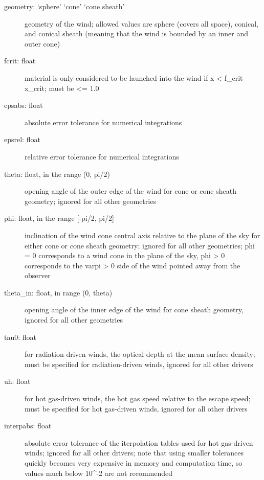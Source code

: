 \documentclass[letterpaper,10pt,english]{sphinxmanual}
\begin{document}
\begin{fulllineitems}
\begin{fulllineitems}
\begin{description}
\begin{description}
\item[{geometry: `sphere' \textbar{} `cone' \textbar{} `cone sheath'}] \leavevmode
geometry of the wind; allowed values are sphere (covers
all space), conical, and conical sheath (meaning that
the wind is bounded by an inner and outer cone)

\item[{fcrit: float}] \leavevmode
material is only considered to be launched into the wind
if x \textless{} f\_crit x\_crit; must be \textless{}= 1.0

\item[{epsabs: float}] \leavevmode
absolute error tolerance for numerical integrations

\item[{epsrel: float}] \leavevmode
relative error tolerance for numerical integrations

\item[{theta: float, in the range (0, pi/2)}] \leavevmode
opening angle of the outer edge of the wind for cone or
cone sheath geometry; ignored for all other geometries

\item[{phi: float, in the range {[}-pi/2, pi/2{]}}] \leavevmode
inclination of the wind cone central axis relative to
the plane of the sky for either cone or cone sheath
geometry; ignored for all other geometries; phi = 0
corresponds to a wind cone in the plane of the sky, phi \textgreater{} 0
corresponds to the varpi \textgreater{} 0 side of the wind pointed
away from the observer

\item[{theta\_in: float, in range (0, theta)}] \leavevmode
opening angle of the inner edge of the wind for cone
sheath geometry, ignored for all other geometries

\item[{tau0: float}] \leavevmode
for radiation-driven winds, the optical depth at the
mean surface density; must be specified for
radiation-driven winds, ignored for all other drivers

\item[{uh: float}] \leavevmode
for hot gas-driven winds, the hot gas speed relative to
the escape speed; must be specified for hot gas-driven
winds, ignored for all other drivers

\item[{interpabs: float}] \leavevmode
absolute error tolerance of the iterpolation tables used
for hot gas-driven winds; ignored for all other drivers;
note that using smaller tolerances quickly becomes very
expensive in memory and computation time, so values much
below 10\textasciicircum{}-2 are not recommended


\end{description}
\end{description}
\end{fulllineitems}
\end{fulllineitems}
\end{document}

